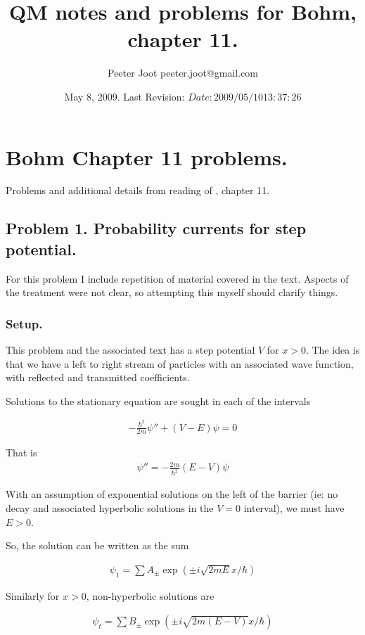 \documentclass{article}
\title{ QM notes and problems for Bohm, chapter 11. }
\author{Peeter Joot \quad peeter.joot@gmail.com }
\date{ May 8, 2009.  Last Revision: $Date: 2009/05/10 13:37:26 $ }
\begin{document}
\maketitle{}
\tableofcontents
\section{ Bohm Chapter 11 problems. }

Problems and additional details from reading of \cite{bohm1989qt}, chapter 11.

\subsection{ Problem 1.  Probability currents for step potential. }

For this problem I include repetition of material covered in the text.
Aspects of the treatment were not clear, so attempting this myself
should clarify things.

\subsubsection{ Setup. }

This problem and the associated text has a step potential $V$ for $x>0$.  The
idea is that we have a left to right stream of particles with an associated
wave function, with reflected and transmitted coefficients.

Solutions to the stationary equation are sought in each of the intervals

\begin{align}
-\frac{\hbar^2}{2m}\psi'' + (V-E)\psi = 0
\end{align}

That is
\begin{align}
\psi'' = - \frac{2m}{\hbar^2} (E-V)\psi
\end{align}

With an assumption of exponential solutions on the left of the barrier
(ie: no decay and associated hyperbolic solutions in the $V=0$ interval),
we must have $E>0$.

So, the solution can be written as the sum

\begin{align*}
\psi_1 = \sum A_{\pm} \exp\left( \pm i \sqrt{2mE} x / \hbar \right)
\end{align*}

Similarly for $x>0$, non-hyperbolic solutions are

\begin{align*}
\psi_t = \sum B_{\pm} \exp\left( \pm i \sqrt{2m(E-V)} x / \hbar \right)
\end{align*}
\end{document}
